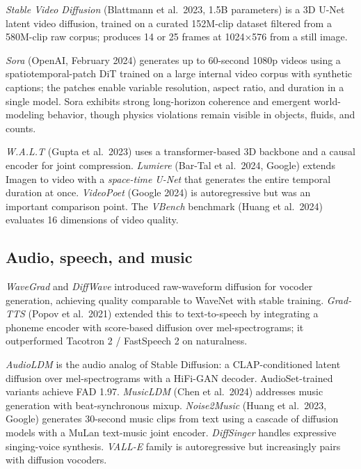 \documentclass{article}
\begin{document}
\emph{Stable Video Diffusion} (Blattmann et al.~2023, 1.5B parameters) is a 3D U-Net latent video diffusion, trained on a curated 152M-clip dataset filtered from a 580M-clip raw corpus; produces 14 or 25 frames at 1024×576 from a still image.

\emph{Sora} (OpenAI, February 2024) generates up to 60-second 1080p videos using a spatiotemporal-patch DiT trained on a large internal video corpus with synthetic captions; the patches enable variable resolution, aspect ratio, and duration in a single model. Sora exhibits strong long-horizon coherence and emergent world-modeling behavior, though physics violations remain visible in objects, fluids, and counts.

\emph{W.A.L.T} (Gupta et al.~2023) uses a transformer-based 3D backbone and a causal encoder for joint compression. \emph{Lumiere} (Bar-Tal et al.~2024, Google) extends Imagen to video with a \emph{space-time U-Net} that generates the entire temporal duration at once. \emph{VideoPoet} (Google 2024) is autoregressive but was an important comparison point. The \emph{VBench} benchmark (Huang et al.~2024) evaluates 16 dimensions of video quality.

\subsection{Audio, speech, and music}\label{audio-speech-and-music}

\emph{WaveGrad} \citep{chen2021wavegradestimating} and \emph{DiffWave} \citep{kong2021diffwaveaversatile} introduced raw-waveform diffusion for vocoder generation, achieving quality comparable to WaveNet with stable training. \emph{Grad-TTS} (Popov et al.~2021) extended this to text-to-speech by integrating a phoneme encoder with score-based diffusion over mel-spectrograms; it outperformed Tacotron 2 / FastSpeech 2 on naturalness.

\emph{AudioLDM} \citep{liu2023zero1to3zeroshoton} is the audio analog of Stable Diffusion: a CLAP-conditioned latent diffusion over mel-spectrograms with a HiFi-GAN decoder. AudioSet-trained variants achieve FAD 1.97. \emph{MusicLDM} (Chen et al.~2024) addresses music generation with beat-synchronous mixup. \emph{Noise2Music} (Huang et al.~2023, Google) generates 30-second music clips from text using a cascade of diffusion models with a MuLan text-music joint encoder. \emph{DiffSinger} \citep{liu20222022} handles expressive singing-voice synthesis. \emph{VALL-E} family is autoregressive but increasingly pairs with diffusion vocoders.
\end{document}

